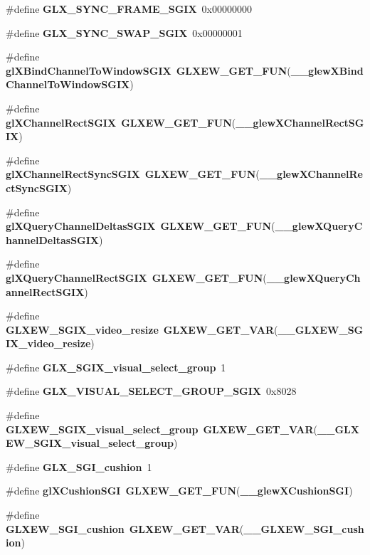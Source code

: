 \begin{DoxyCompactItemize}
\item 
\#define {\bf G\+L\+X\+\_\+\+S\+Y\+N\+C\+\_\+\+F\+R\+A\+M\+E\+\_\+\+S\+G\+IX}~0x00000000
\item 
\#define {\bf G\+L\+X\+\_\+\+S\+Y\+N\+C\+\_\+\+S\+W\+A\+P\+\_\+\+S\+G\+IX}~0x00000001
\item 
\#define {\bf gl\+X\+Bind\+Channel\+To\+Window\+S\+G\+IX}~{\bf G\+L\+X\+E\+W\+\_\+\+G\+E\+T\+\_\+\+F\+UN}({\bf \+\_\+\+\_\+glew\+X\+Bind\+Channel\+To\+Window\+S\+G\+IX})
\item 
\#define {\bf gl\+X\+Channel\+Rect\+S\+G\+IX}~{\bf G\+L\+X\+E\+W\+\_\+\+G\+E\+T\+\_\+\+F\+UN}({\bf \+\_\+\+\_\+glew\+X\+Channel\+Rect\+S\+G\+IX})
\item 
\#define {\bf gl\+X\+Channel\+Rect\+Sync\+S\+G\+IX}~{\bf G\+L\+X\+E\+W\+\_\+\+G\+E\+T\+\_\+\+F\+UN}({\bf \+\_\+\+\_\+glew\+X\+Channel\+Rect\+Sync\+S\+G\+IX})
\item 
\#define {\bf gl\+X\+Query\+Channel\+Deltas\+S\+G\+IX}~{\bf G\+L\+X\+E\+W\+\_\+\+G\+E\+T\+\_\+\+F\+UN}({\bf \+\_\+\+\_\+glew\+X\+Query\+Channel\+Deltas\+S\+G\+IX})
\item 
\#define {\bf gl\+X\+Query\+Channel\+Rect\+S\+G\+IX}~{\bf G\+L\+X\+E\+W\+\_\+\+G\+E\+T\+\_\+\+F\+UN}({\bf \+\_\+\+\_\+glew\+X\+Query\+Channel\+Rect\+S\+G\+IX})
\item 
\#define {\bf G\+L\+X\+E\+W\+\_\+\+S\+G\+I\+X\+\_\+video\+\_\+resize}~{\bf G\+L\+X\+E\+W\+\_\+\+G\+E\+T\+\_\+\+V\+AR}({\bf \+\_\+\+\_\+\+G\+L\+X\+E\+W\+\_\+\+S\+G\+I\+X\+\_\+video\+\_\+resize})
\item 
\#define {\bf G\+L\+X\+\_\+\+S\+G\+I\+X\+\_\+visual\+\_\+select\+\_\+group}~1
\item 
\#define {\bf G\+L\+X\+\_\+\+V\+I\+S\+U\+A\+L\+\_\+\+S\+E\+L\+E\+C\+T\+\_\+\+G\+R\+O\+U\+P\+\_\+\+S\+G\+IX}~0x8028
\item 
\#define {\bf G\+L\+X\+E\+W\+\_\+\+S\+G\+I\+X\+\_\+visual\+\_\+select\+\_\+group}~{\bf G\+L\+X\+E\+W\+\_\+\+G\+E\+T\+\_\+\+V\+AR}({\bf \+\_\+\+\_\+\+G\+L\+X\+E\+W\+\_\+\+S\+G\+I\+X\+\_\+visual\+\_\+select\+\_\+group})
\item 
\#define {\bf G\+L\+X\+\_\+\+S\+G\+I\+\_\+cushion}~1
\item 
\#define {\bf gl\+X\+Cushion\+S\+GI}~{\bf G\+L\+X\+E\+W\+\_\+\+G\+E\+T\+\_\+\+F\+UN}({\bf \+\_\+\+\_\+glew\+X\+Cushion\+S\+GI})
\item 
\#define {\bf G\+L\+X\+E\+W\+\_\+\+S\+G\+I\+\_\+cushion}~{\bf G\+L\+X\+E\+W\+\_\+\+G\+E\+T\+\_\+\+V\+AR}({\bf \+\_\+\+\_\+\+G\+L\+X\+E\+W\+\_\+\+S\+G\+I\+\_\+cushion})
\item 

\end{DoxyCompactItemize}
